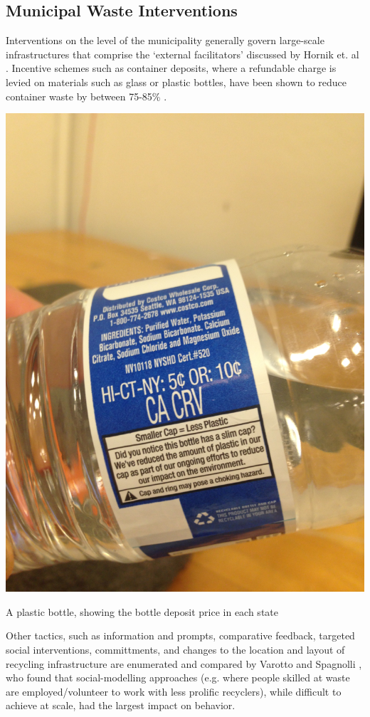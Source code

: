 \documentclass[nofonts,nols,justified,nobib]{tufte-book}
\begin{document}
\subsection*{Municipal Waste Interventions}
Interventions on the level of the municipality generally govern large-scale infrastructures that comprise the `external facilitators' discussed by Hornik et. al \cite{hornik_determinants_1995}. Incentive schemes such as container deposits, where a refundable charge is levied on materials such as glass or plastic bottles, have been shown to reduce container waste by between 75-85\% \cite{hong_economic_1993}. 
\begin{marginfigure}
\includegraphics[width=\textwidth]{img/1/bottle-deposit.JPG}
\caption{A plastic bottle, showing the bottle deposit price in each state}
\end{marginfigure}
Other tactics, such as information and prompts, comparative feedback, targeted social interventions, committments, and changes to the location and layout of recycling infrastructure are enumerated and compared by Varotto and Spagnolli \cite{varotto_psychological_2017}, who found that social-modelling approaches (e.g. where people skilled at waste are employed/volunteer to work with less prolific recyclers), while difficult to achieve at scale, had the largest impact on behavior. 
\end{document}
